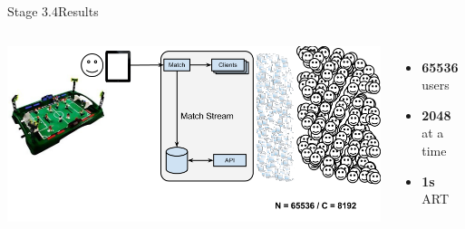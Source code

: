 \documentclass[utf8]{beamer}
\begin{document}
\begin{frame}{Stage 3.4}{Results}
	\begin{columns}
			\includegraphics[top=-1,width=\textwidth]{img/MatchStream-3.png}
			\begin{itemize}
				\item \textbf{\Large 65536} users
				\item \textbf{\Large 2048} at a time
				\item \textbf{\Large 1s} ART
			\end{itemize}
	\end{columns}
\end{frame}
\end{document}
